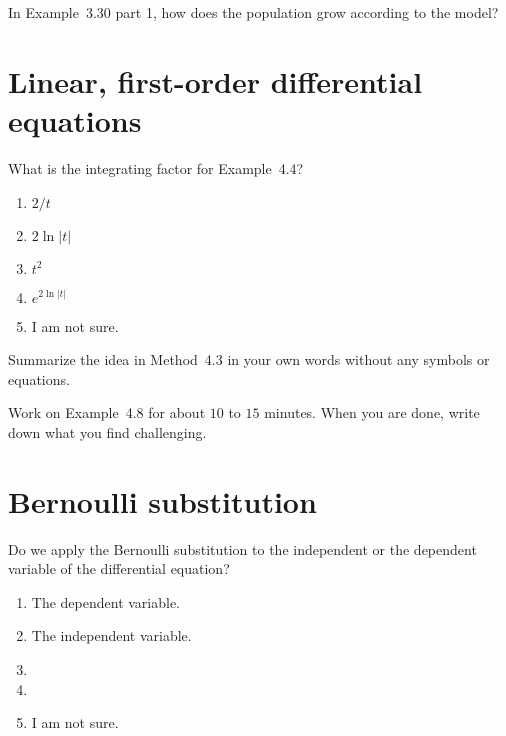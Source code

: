\documentclass[t, 14pt]{beamer}
\begin{document}
\begin{frame}
  In Example~3.30 part 1, how does the population grow according to the model?

\end{frame}

\section{Linear, first-order differential equations}

\begin{frame}
  What is the integrating factor for Example~4.4?

  \begin{enumerate}
    \item \(2/t\)
    \item \(2\ln|t|\)
    \item \(t^{2}\)
    \item \(e^{2\ln|t|}\)
    \item I am not sure. 
  \end{enumerate}
\end{frame}

\begin{frame}[c]
  Summarize the idea in Method~4.3 in your own words without any symbols or equations.
\end{frame}

\begin{frame}[c]
  Work on Example~4.8 for about \(10\) to \(15\) minutes.  When you are done, write down what you find challenging.
\end{frame}

\section{Bernoulli substitution}

\begin{frame}[t]
  Do we apply the Bernoulli substitution to the independent or the dependent variable of the differential equation?

  \begin{enumerate} 
    \item The dependent variable.
    \item The independent variable.
    \item 
    \item 
    \item I am not sure.
  \end{enumerate} 
\end{frame}
\end{document}
